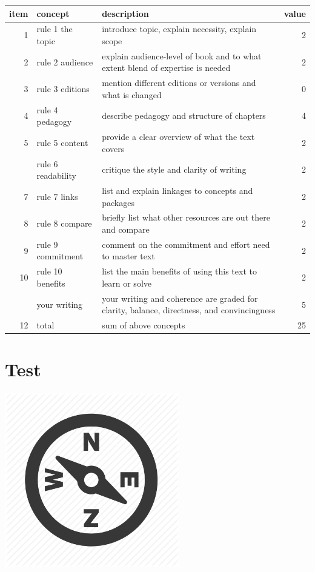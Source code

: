 \documentclass[
]{book}
\begin{document}
\begin{tabular}{rllr}
\toprule
item & concept & description & value\\
\midrule
1 & rule 1 the topic & introduce topic, explain necessity, explain scope & 2\\
2 & rule 2 audience & explain audience-level of book and to what extent blend of expertise is needed & 2\\
3 & rule 3 editions & mention different editions or versions and what is changed & 0\\
4 & rule 4 pedagogy & describe pedagogy and structure of chapters & 4\\
5 & rule 5 content & provide a clear overview of what the text covers & 2\\
\addlinespace
6 & rule 6 readability & critique the style and clarity of writing & 2\\
7 & rule 7 links & list and explain linkages to concepts and packages & 2\\
8 & rule 8 compare & briefly list what other resources are out there and compare & 2\\
9 & rule 9 commitment & comment on the commitment and effort need to master text & 2\\
10 & rule 10 benefits & list the main benefits of using this text to learn or solve & 2\\
\addlinespace
11 & your writing & your writing and coherence are graded for clarity, balance, directness, and convincingness & 5\\
12 & total & sum of above concepts & 25\\
\bottomrule
\end{tabular}

\hypertarget{test}{%
\chapter{Test}\label{test}}

\includegraphics[width=3in,height=\textheight]{./test.png}
\end{document}
